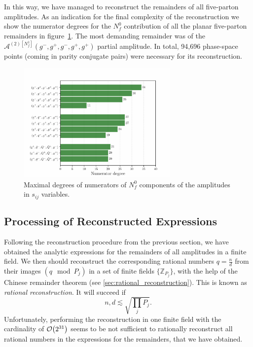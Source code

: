 In this way, we have managed to reconstruct the remainders of all five-parton amplitudes.
As an indication for the final complexity of the reconstruction we show the
numerator degrees for the $N_f^0$ contribution of all the planar five-parton
remainders in figure~\ref{fig:degrees-all}.
The most demanding remainder was of the $\mathcal{A}^{(2)[N_f^1]}(g^-,g^+,g^-,g^+,g^+)$ partial amplitude.
In total, 94,696 phase-space points  (coming in parity conjugate pairs) were necessary for its reconstruction.

\begin{figure}[ht]
  \centering
  \includegraphics[width = 0.7\textwidth]{plots/plot_sijs.pdf}
  \caption{Maximal degrees of numerators of $N_f^0$ components of the amplitudes in $s_{ij}$ variables.}
  \label{fig:degrees-all}
\end{figure}



\subsection{Processing of Reconstructed Expressions}

Following the reconstruction procedure from the previous section, we have obtained the analytic expressions
for the remainders of all amplitudes in a finite field.
We then should reconstruct the corresponding rational numbers $q=\frac{n}{d}$ from
their images $(q \mod P_j)$ in a set of finite fields $\{\mathbb{Z}_{P_j}\}$, 
with the help of the Chinese remainder theorem (see \cref{sec:rational_reconstruction}).
This is known as \emph{rational reconstruction}.
It will succeed if 
\begin{equation} \label{eq:condition_rat_reconstruct}
  n,d \lesssim \sqrt{\prod_jP_j}.
\end{equation}
Unfortunately, performing the reconstruction in one finite field with the cardinality of $\order{2^{31}}$ 
seems to be not sufficient to rationally reconstruct all rational numbers in the expressions for the remainders, that we have obtained.

